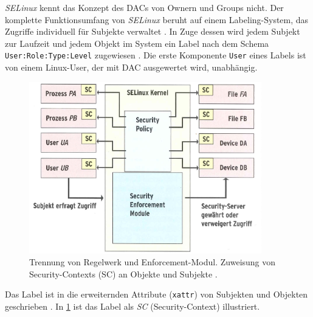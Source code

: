 \documentclass[../main.tex]{subfiles}
\begin{document}
{				\emph{SELinux} kennt das Konzept des DACs von Ownern und Groups nicht. Der komplette Funktionsumfang von \emph{SELinux} beruht auf einem Labeling-System, das Zugriffe individuell für Subjekte verwaltet \cite{SELinuxComic}. In Zuge dessen wird jedem Subjekt zur Laufzeit und jedem Objekt im System ein Label nach dem Schema \texttt{User:Role:Type:Level} zugewiesen \cite{atomicDockerSELinux}. Die erste Komponente \texttt{User} eines Labels ist von einem Linux-User, der mit \acrshort{DAC} ausgewertet wird, unabhängig.

				\begin{figure}[h]
						\centering
						\includegraphics[width=0.9\textwidth]{./images/sec_SELinux.jpg}
						\caption{Trennung von Regelwerk und Enforcement-Modul. Zuweisung von Security-Contexts (SC) an Objekte und Subjekte \cite[S.63]{linuxMagazineSec}.}
						\label{fig:sec_SELinux}
				\end{figure}

				Das Label ist in die erweiternden Attribute (\texttt{xattr}) von Subjekten und Objekten geschrieben \cite[S.65]{linuxMagazineSec}. In \fig \ref{fig:sec_SELinux} ist das Label als \emph{SC} (Security-Context) illustriert.


}
\end{document}
